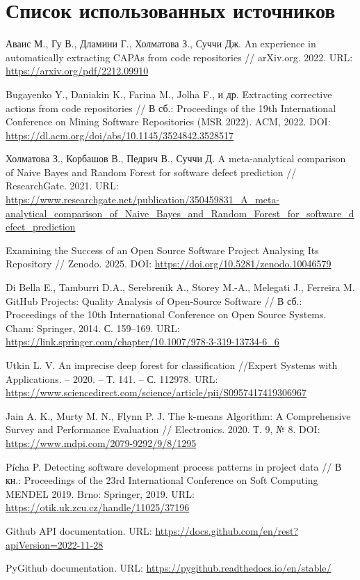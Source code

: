 \chapter*{Список использованных источников}  
\label{references}  

\begin{thebibliography}{99}  
	
	 Аваис М., Гу В., Дламини Г., Холматова З., Суччи Дж. An experience in automatically extracting CAPAs from code repositories // arXiv.org. 2022. URL: \url{https://arxiv.org/pdf/2212.09910}  
	
	 Bugayenko Y., Daniakin K., Farina M., Jolha F., и др. Extracting corrective actions from code repositories // В сб.: Proceedings of the 19th International Conference on Mining Software Repositories (MSR 2022). ACM, 2022. DOI: \url{https://dl.acm.org/doi/abs/10.1145/3524842.3528517}  
	
	 Холматова З., Корбашов В., Педрич В., Суччи Д. A meta-analytical comparison of Naive Bayes and Random Forest for software defect prediction // ResearchGate. 2021. URL: \url{https://www.researchgate.net/publication/350459831_A_meta-analytical_comparison_of_Naive_Bayes_and_Random_Forest_for_software_defect_prediction}  
	
	 Examining the Success of an Open Source Software Project Analysing Its Repository // Zenodo. 2025. DOI: \url{https://doi.org/10.5281/zenodo.10046579}  
	
	 Di Bella E., Tamburri D.A., Serebrenik A., Storey M.-A., Melegati J., Ferreira M. GitHub Projects: Quality Analysis of Open-Source Software // В сб.: Proceedings of the 10th International Conference on Open Source Systems. Cham: Springer, 2014. С. 159–169. URL: \url{https://link.springer.com/chapter/10.1007/978-3-319-13734-6_6}  
	
	 Utkin L. V. An imprecise deep forest for classification //Expert Systems with Applications. – 2020. – Т. 141. – С. 112978. URL: \url{https://www.sciencedirect.com/science/article/pii/S0957417419306967}  
	
	 Jain A. K., Murty M. N., Flynn P. J. The k-means Algorithm: A Comprehensive Survey and Performance Evaluation // Electronics. 2020. Т. 9, № 8. DOI: \url{https://www.mdpi.com/2079-9292/9/8/1295}  
	
	 Pícha P. Detecting software development process patterns in project data // В кн.: Proceedings of the 23rd International Conference on Soft Computing MENDEL 2019. Brno: Springer, 2019. URL: \url{https://otik.uk.zcu.cz/handle/11025/37196}  
	
	 Github API documentation. URL: \url{https://docs.github.com/en/rest?apiVersion=2022-11-28}  
	
	 PyGithub documentation. URL: \url{https://pygithub.readthedocs.io/en/stable/}  
	
\end{thebibliography}
